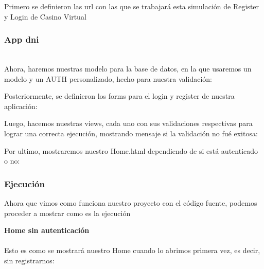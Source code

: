 \documentclass{article}
\begin{document}
    Primero se definieron las url con las que se trabajará esta simulación de Register y Login de Casino Virtual

    
    
    \subsubsection{App dni}\\

    Ahora, haremos nuestras modelo para la base de datos, en la que usaremos un modelo y un AUTH personalizado, hecho para nuestra validación:
    
     

     Posteriormente, se definieron los forms para el login y register de nuestra aplicación:
    
     

     Luego, hacemos nuestras views, cada uno con sus validaciones respectivas para lograr una correcta ejecución, mostrando mensaje si la validación no fué exitosa:
    
     

    Por ultimo, mostraremos nuestro Home.html dependiendo de si está autenticado o no:
    
     

     \subsubsection{Ejecución}
     Ahora que vimos como funciona nuestro proyecto con el código fuente, podemos proceder a mostrar como es la ejecución

     \textbf{Home sin autenticación}\\\\
     Esto es como se mostrará nuestro Home cuando lo abrimos primera vez, es decir, sin registrarnos:
     
\end{document}
